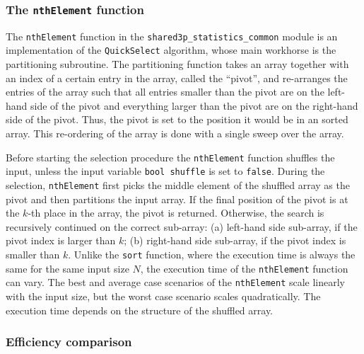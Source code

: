 \documentclass[11pt]{article}
\newcommand{\ct}[1]{\texttt{#1}}
\begin{document}


\subsubsection{The \ct{nthElement} function} %
\label{ssub:the_nthelement_function}

The \ct{nthElement} function in the \ct{shared3p\_statistics\_common} module is an implementation of the \ct{QuickSelect} algorithm, whose main workhorse is the partitioning subroutine. The partitioning function takes an array together with an index of a certain entry in the array, called the ``pivot'', and re-arranges the entries of the array such that all entries smaller than the pivot are on the left-hand side of the pivot and everything larger than the pivot are on the right-hand side of the pivot. Thus, the pivot is set to the position it would be in an sorted array. This re-ordering of the array is done with a single sweep over the array. 

Before starting the selection procedure the \ct{nthElement} function shuffles the input, unless the input variable \ct{bool shuffle} is set to \ct{false}. During the selection, \ct{nthElement} first picks the middle element of the shuffled array as the pivot and then partitions the input array. If the final position of the pivot is at the $k$-th place in the array, the pivot is returned. Otherwise, the search is recursively continued on the correct sub-array: (a) left-hand side sub-array, if the pivot index is larger than $k$; (b) right-hand side sub-array, if the pivot index is smaller than $k$. Unlike the \ct{sort} function, where the execution time is always the same for the same input size $N$, the execution time of the \ct{nthElement} function can vary. The best and average case scenarios of the \ct{nthElement} scale linearly with the input size, but the worst case scenario scales quadratically. The execution time depends on the structure of the shuffled array. 


\subsubsection{Efficiency comparison} %
\label{ssub:efficiency_comparison}
\end{document}
